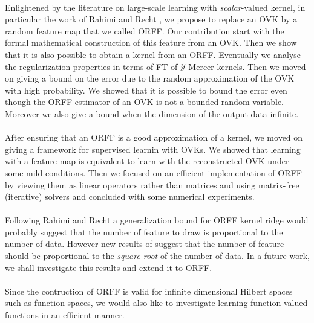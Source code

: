 \documentclass[twoside,11pt]{article}
\begin{document}
\paragraph{}
Enlightened by the literature on large-scale learning with
\emph{scalar}-valued kernel, in particular the work of Rahimi and Recht
\citep{Rahimi2007}, we propose to replace an \acs{OVK} by a random feature
map that we called \acl{ORFF}. Our contribution start with the formal
mathematical construction of this feature from an \acs{OVK}. Then we show
that it is also possible to obtain a kernel from an \acs{ORFF}. Eventually
we analyse the regularization properties in terms of \acl{FT} of
$\mathcal{Y}$-Mercer kernels. Then we moved on giving a bound on the error
due to the random approximation of the \acs{OVK} with high probability.
We showed that it is possible to bound the error even though the \acs{ORFF}
estimator of an \acs{OVK} is not a bounded random variable. Moreover we
also give a bound when the dimension of the output data infinite.
\paragraph{}
After ensuring that an \acs{ORFF} is a good approximation of a kernel, we
moved on giving a framework for supervised learnin with \aclp{OVK}. We showed
that learning with a feature map is equivalent to learn with the reconstructed
\acs{OVK} under some mild conditions. Then we focused on an efficient
implementation of \acs{ORFF} by viewing them as linear operators rather than
matrices and using matrix-free (iterative) solvers and concluded with some
numerical experiments.
\paragraph{}
Following Rahimi and Recht a generalization bound for \acs{ORFF} kernel ridge
would probably suggest that the number of feature to draw is proportional to
the number of data.  However new results of \citet{rudi2016generalization}
suggest that the number of feature should be proportional to the \emph{square
root} of the number of data. In a future work, we shall investigate this
results and extend it to \acs{ORFF}.
\paragraph{}
Since the contruction of \acs{ORFF} is valid for infinite dimensional Hilbert
spaces such as function spaces, we would also like to investigate learning
function valued functions in an efficient manner.




\appendix



\end{document}
